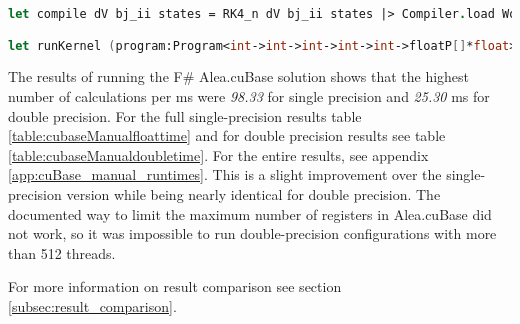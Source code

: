 \begin{lstlisting}[language=FSharp, caption=Kernel compilation and execution methods in F\# Alea.cuBase, label=cubase_compileandrun]
let compile dV bj_ii states = RK4_n dV bj_ii states |> Compiler.load Worker.Default

let runKernel (program:Program<int->int->int->int->int->floatP[]*float>) a b blocks threads = program.Run a b steps blocks threads
\end{lstlisting}

The results of running the F\# Alea.cuBase solution shows that the highest number of calculations per ms were \emph{98.33} for single precision and \emph{25.30} ms for double precision.
For the full single-precision results table \ref{table:cubaseManualfloattime} and for double precision results see table \ref{table:cubaseManualdoubletime}.
For the entire results, see appendix \ref{app:cuBase_manual_runtimes}.
This is a slight improvement over the single-precision version while being nearly identical for double precision.
The documented way to limit the maximum number of registers in Alea.cuBase did not work, so it was impossible to run double-precision configurations with more than 512 threads.

For more information on result comparison see section \ref{subsec:result_comparison}.

\begin{table}[h!]
\centering
{}
\caption{F\# Alea.cuBase calculations per ms with single precision\label{table:cubaseManualfloattime}}
\end{table}

